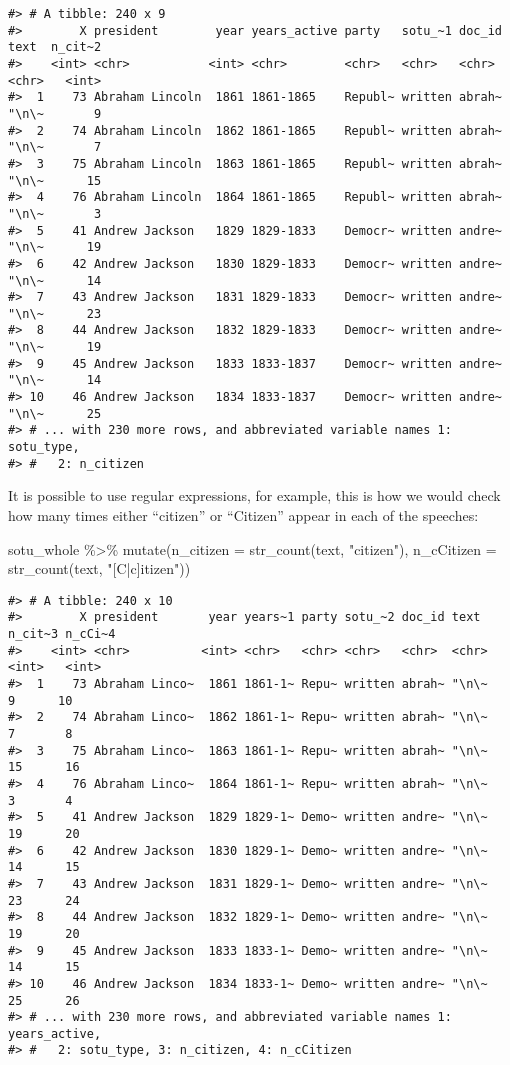 \documentclass[
]{book}
\newenvironment{Shaded}{\begin{snugshade}}{\end{snugshade}}
\newcommand{\AttributeTok}[1]{\textcolor[rgb]{0.77,0.63,0.00}{#1}}
\newcommand{\FunctionTok}[1]{\textcolor[rgb]{0.00,0.00,0.00}{#1}}
\newcommand{\NormalTok}[1]{#1}
\newcommand{\SpecialCharTok}[1]{\textcolor[rgb]{0.00,0.00,0.00}{#1}}
\newcommand{\StringTok}[1]{\textcolor[rgb]{0.31,0.60,0.02}{#1}}
\begin{document}
\begin{verbatim}
#> # A tibble: 240 x 9
#>        X president        year years_active party   sotu_~1 doc_id text  n_cit~2
#>    <int> <chr>           <int> <chr>        <chr>   <chr>   <chr>  <chr>   <int>
#>  1    73 Abraham Lincoln  1861 1861-1865    Republ~ written abrah~ "\n\~       9
#>  2    74 Abraham Lincoln  1862 1861-1865    Republ~ written abrah~ "\n\~       7
#>  3    75 Abraham Lincoln  1863 1861-1865    Republ~ written abrah~ "\n\~      15
#>  4    76 Abraham Lincoln  1864 1861-1865    Republ~ written abrah~ "\n\~       3
#>  5    41 Andrew Jackson   1829 1829-1833    Democr~ written andre~ "\n\~      19
#>  6    42 Andrew Jackson   1830 1829-1833    Democr~ written andre~ "\n\~      14
#>  7    43 Andrew Jackson   1831 1829-1833    Democr~ written andre~ "\n\~      23
#>  8    44 Andrew Jackson   1832 1829-1833    Democr~ written andre~ "\n\~      19
#>  9    45 Andrew Jackson   1833 1833-1837    Democr~ written andre~ "\n\~      14
#> 10    46 Andrew Jackson   1834 1833-1837    Democr~ written andre~ "\n\~      25
#> # ... with 230 more rows, and abbreviated variable names 1: sotu_type,
#> #   2: n_citizen
\end{verbatim}

It is possible to use regular expressions, for example, this is how we would check how many times either ``citizen'' or ``Citizen'' appear in each of the speeches:

\begin{Shaded}
\begin{Highlighting}[]
\NormalTok{sotu\_whole }\SpecialCharTok{\%\textgreater{}\%} 
    \FunctionTok{mutate}\NormalTok{(}\AttributeTok{n\_citizen =} \FunctionTok{str\_count}\NormalTok{(text, }\StringTok{"citizen"}\NormalTok{),}
           \AttributeTok{n\_cCitizen =} \FunctionTok{str\_count}\NormalTok{(text, }\StringTok{"[C|c]itizen"}\NormalTok{)) }
\end{Highlighting}
\end{Shaded}

\begin{verbatim}
#> # A tibble: 240 x 10
#>        X president       year years~1 party sotu_~2 doc_id text  n_cit~3 n_cCi~4
#>    <int> <chr>          <int> <chr>   <chr> <chr>   <chr>  <chr>   <int>   <int>
#>  1    73 Abraham Linco~  1861 1861-1~ Repu~ written abrah~ "\n\~       9      10
#>  2    74 Abraham Linco~  1862 1861-1~ Repu~ written abrah~ "\n\~       7       8
#>  3    75 Abraham Linco~  1863 1861-1~ Repu~ written abrah~ "\n\~      15      16
#>  4    76 Abraham Linco~  1864 1861-1~ Repu~ written abrah~ "\n\~       3       4
#>  5    41 Andrew Jackson  1829 1829-1~ Demo~ written andre~ "\n\~      19      20
#>  6    42 Andrew Jackson  1830 1829-1~ Demo~ written andre~ "\n\~      14      15
#>  7    43 Andrew Jackson  1831 1829-1~ Demo~ written andre~ "\n\~      23      24
#>  8    44 Andrew Jackson  1832 1829-1~ Demo~ written andre~ "\n\~      19      20
#>  9    45 Andrew Jackson  1833 1833-1~ Demo~ written andre~ "\n\~      14      15
#> 10    46 Andrew Jackson  1834 1833-1~ Demo~ written andre~ "\n\~      25      26
#> # ... with 230 more rows, and abbreviated variable names 1: years_active,
#> #   2: sotu_type, 3: n_citizen, 4: n_cCitizen
\end{verbatim}
\end{document}
